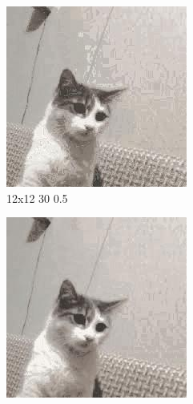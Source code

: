 \documentclass[12pt,a4paper]{article}
\begin{document}
\begin{figure}[htb]
\medskip
\begin{subfigure}{0.25\textwidth}
  \includegraphics[width=\linewidth]{images/small/12-12-30-05}
  \caption{12x12 30 0.5}
  \label{fig:6}
\end{subfigure}
\begin{subfigure}{0.25\textwidth}
  \includegraphics[width=\linewidth]{images/small/16-16-30-05}

\end{subfigure}
\end{figure}
\end{document}
